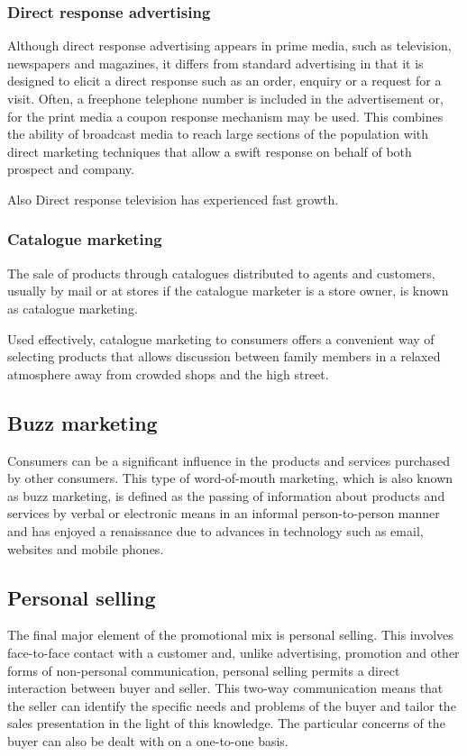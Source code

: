 \documentclass{article}
\begin{document}
\subsubsection{Direct response advertising}
Although direct response advertising appears in prime media, such as television, newspapers and magazines, it differs from standard advertising in that it is designed to elicit a direct response such as an order, enquiry or a request for a visit. Often, a freephone telephone number is included in the advertisement or, for the print media a coupon response mechanism may be used. This combines the ability of broadcast media to reach large sections of the population with direct marketing techniques that allow a swift response on behalf of both prospect and company.

Also Direct response television has experienced fast growth. 

\subsubsection{Catalogue marketing}
The sale of products through catalogues distributed to agents and customers, usually by mail or at stores if the catalogue marketer is a store owner, is known as catalogue marketing.

Used effectively, catalogue marketing to consumers offers a convenient way of selecting products that allows discussion between family members in a relaxed atmosphere away from crowded shops and the high street. 

\subsection{Buzz marketing}
Consumers can be a significant influence in the products and services purchased by other consumers. This type of word-of-mouth marketing, which is also known as buzz marketing, is defined as the passing of information about products and services by verbal or electronic means in an informal person-to-person manner and has enjoyed a renaissance due to advances in technology such as email, websites and mobile phones. 

\subsection{Personal selling}
The final major element of the promotional mix is personal selling. This involves face-to-face contact with a customer and, unlike advertising, promotion and other forms of non-personal communication, personal selling permits a direct interaction between buyer and seller. This two-way communication means that the seller can identify the specific needs and problems of the buyer and tailor the sales presentation in the light of this knowledge. The particular concerns of the buyer can also be dealt with on a one-to-one basis.
\end{document}
